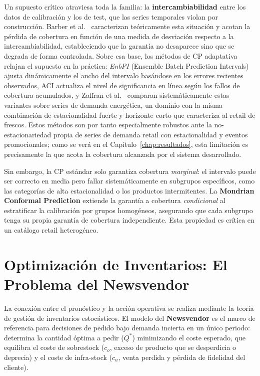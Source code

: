 Un supuesto crítico atraviesa toda la familia: la \textbf{intercambiabilidad} entre los datos de calibración y los de test, que las series temporales violan por construcción. Barber et al.\ \cite{barber2023beyond} caracterizan teóricamente esta situación y acotan la pérdida de cobertura en función de una medida de desviación respecto a la intercambiabilidad, estableciendo que la garantía no desaparece sino que se degrada de forma controlada. Sobre esa base, los métodos de CP adaptativa relajan el supuesto en la práctica: \textit{EnbPI} \cite{xu2021conformal} (Ensemble Batch Prediction Intervals) ajusta dinámicamente el ancho del intervalo basándose en los errores recientes observados, ACI \cite{gibbs2021adaptive} actualiza el nivel de significancia en línea según los fallos de cobertura acumulados, y Zaffran et al.\ \cite{zaffran2022adaptive} comparan sistemáticamente estas variantes sobre series de demanda energética, un dominio con la misma combinación de estacionalidad fuerte y horizonte corto que caracteriza al retail de frescos. Estos métodos son por tanto especialmente robustos ante la no-estacionariedad propia de series de demanda retail con estacionalidad y eventos promocionales; como se verá en el Capítulo~\ref{chap:resultados}, esta limitación es precisamente la que acota la cobertura alcanzada por el sistema desarrollado.

Sin embargo, la CP estándar solo garantiza cobertura \textit{marginal}: el intervalo puede ser correcto en media pero fallar sistemáticamente en subgrupos específicos, como las categorías de alta estacionalidad o los productos intermitentes. La \textbf{Mondrian Conformal Prediction} \cite{vovk2005algorithmic} extiende la garantía a cobertura \textit{condicional} al estratificar la calibración por grupos homogéneos, asegurando que cada subgrupo tenga su propia garantía de cobertura independiente. Esta propiedad es crítica en un catálogo retail heterogéneo.

\section{Optimización de Inventarios: El Problema del Newsvendor}
\label{sec:newsvendor}
La conexión entre el pronóstico y la acción operativa se realiza mediante la teoría de gestión de inventarios estocásticos. El modelo del \textbf{Newsvendor} \cite{silver1998inventory} es el marco de referencia para decisiones de pedido bajo demanda incierta en un único periodo: determina la cantidad óptima a pedir ($Q^*$) minimizando el coste esperado, que equilibra el coste de sobrestock ($c_o$, exceso de producto que se desperdicia o deprecia) y el coste de infra-stock ($c_u$, venta perdida y pérdida de fidelidad del cliente).

